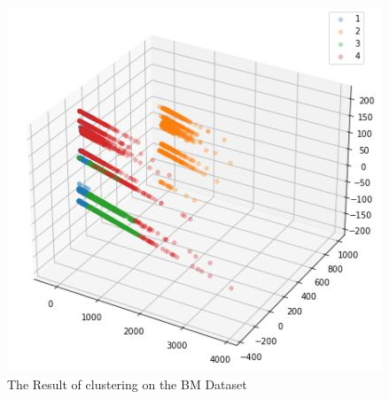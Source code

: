 \documentclass{mpaper}
\begin{document}
\begin{figure}
\centering
\begin{center}
\includegraphics[scale=0.7]{BM Clustering.JPG}
\end{center}
\caption{\label{fig-BMcl}The Result of clustering on the BM Dataset}
\end{figure}
\end{document}
